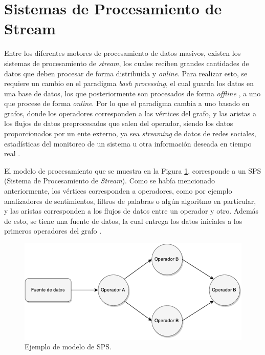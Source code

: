 \section{Sistemas de Procesamiento de Stream}
\label{sec:SPS}

Entre los diferentes motores de procesamiento de datos masivos, existen los sistemas de procesamiento de \textsl{stream}, los cuales reciben grandes cantidades de datos que deben procesar de forma distribuida y \textsl{online}. Para realizar esto, se requiere un cambio en el paradigma \textsl{bash processing}, el cual guarda los datos en una base de datos, los que posteriormente son procesados de forma \textsl{offline} \citep{HawwashN14}, a uno que procese de forma \textsl{online}. Por lo que el paradigma cambia a uno basado en grafos, donde los operadores corresponden a las vértices del grafo, y las aristas a los flujos de datos preprocesados que salen del operador, siendo los datos proporcionados por un ente externo, ya sea \textit{streaming} de datos de redes sociales, estadísticas del monitoreo de un sistema u otra información deseada en tiempo real \citep{Shahrivari14}.

El modelo de procesamiento que se muestra en la Figura \ref{fig:grafo}, corresponde a un SPS (Sistema de Procesamiento de \textit{Stream}). Como se había mencionado anteriormente, los vértices corresponden a operadores, como por ejemplo analizadores de sentimientos, filtros de palabras o algún algoritmo en particular, y las aristas corresponden a los flujos de datos entre un operador y otro. Además de esto, se tiene una fuente de datos, la cual entrega los datos iniciales a los primeros operadores del grafo \citep{AppelFFB12}.

\begin{figure}[ht!]
  \centering
    \includegraphics[scale=1]{images/SPS.pdf}
  \caption{Ejemplo de modelo de SPS.}
  \label{fig:grafo}
\end{figure}

